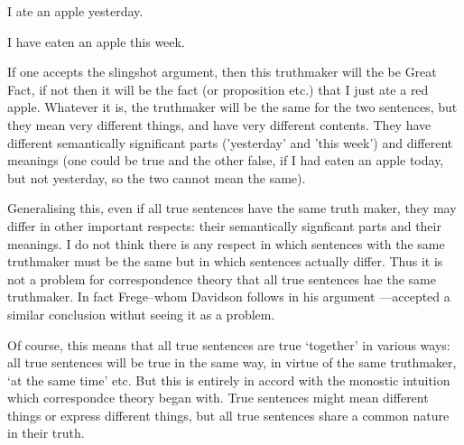 	\begin{example} \label{yesterday} 
	I ate an apple yesterday. 
	\end{example}

	\begin{example} \label{week} 
	I have eaten an apple this week.
	\end{example}

If one accepts the slingshot argument, then this truthmaker will the be Great Fact, if not then it will be the fact (or proposition etc.) that I just ate a red apple.
Whatever it is, the truthmaker will be the same for the two sentences, but they mean very different things, and have very different contents.
They have different semantically significant parts ('yesterday' and 'this week') and different meanings (one could be true and the other false, if I had eaten an apple today, but not yesterday, so the two cannot mean the same).

Generalising this, even if all true sentences have the same truth maker, they may differ in other important respects: their semantically signficant parts and their meanings.
I do not think there is any respect in which sentences with the same truthmaker must be the same but in which sentences actually differ.
Thus it is not a problem for correspondence theory that all true sentences hae the same truthmaker.
In fact Frege--whom Davidson follows in his argument \parencite[750]{Davidson_1969}---accepted a similar conclusion withut seeing it as a problem.
\parencite[216]{Frege_1948} 

Of course, this means that all true sentences are true `together' in various ways: all true sentences will be true in the same way, in virtue of the same truthmaker, `at the same time' etc.
But this is entirely in accord with the monostic intuition which correspondce theory began with.
True sentences might mean different things or express different things, but all true sentences share a common nature in their truth.
